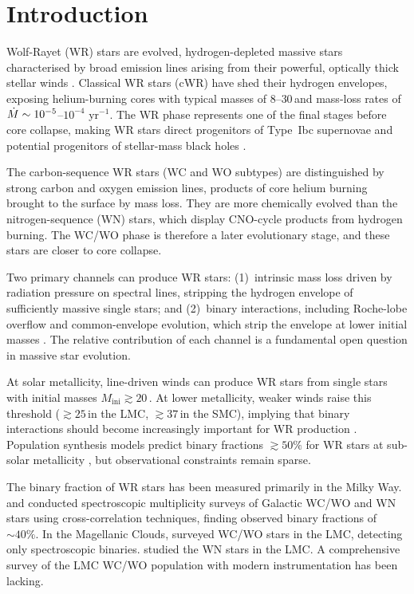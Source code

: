 \section{Introduction}
\label{sec:intro}

Wolf-Rayet (WR) stars are evolved, hydrogen-depleted massive stars
characterised by broad emission lines arising from their powerful,
optically thick stellar winds \citep{Crowther2007}. Classical WR stars
(cWR) have shed their hydrogen envelopes, exposing helium-burning cores
with typical masses of $8$--$30$\,\Msun and mass-loss rates of
$\dot{M} \sim 10^{-5}$--$10^{-4}$\,\Msun\,yr$^{-1}$. The WR phase
represents one of the final stages before core collapse, making WR stars
direct progenitors of Type~Ibc supernovae and potential progenitors of
stellar-mass black holes \citep{Sander2019}.

The carbon-sequence WR stars (WC and WO subtypes) are distinguished by
strong carbon and oxygen emission lines, products of core helium burning
brought to the surface by mass loss. They are more chemically evolved than
the nitrogen-sequence (WN) stars, which display CNO-cycle products from
hydrogen burning. The WC/WO phase is therefore a later evolutionary stage,
and these stars are closer to core collapse.

Two primary channels can produce WR stars: (1)~intrinsic mass loss driven
by radiation pressure on spectral lines, stripping the hydrogen envelope of
sufficiently massive single stars; and (2)~binary interactions, including
Roche-lobe overflow and common-envelope evolution, which strip the envelope
at lower initial masses \citep{Shenar2020}. The relative contribution of
each channel is a fundamental open question in massive star evolution.

At solar metallicity, line-driven winds can produce WR stars from single
stars with initial masses $M_\mathrm{ini} \gtrsim 20$\,\Msun. At lower
metallicity, weaker winds raise this threshold ($\gtrsim 25$\,\Msun in the
LMC, $\gtrsim 37$\,\Msun in the SMC), implying that binary interactions
should become increasingly important for WR production
\citep{Shenar2020}. Population synthesis models predict binary fractions
$\gtrsim 50\%$ for WR stars at sub-solar metallicity
\citep{Marchant2023}, but observational constraints remain sparse.

The binary fraction of WR stars has been measured primarily in the Milky
Way. \citet{Dsilva2020} and \citet{Dsilva2023} conducted spectroscopic
multiplicity surveys of Galactic WC/WO and WN stars using
cross-correlation techniques, finding observed binary fractions of
$\sim 40\%$. In the Magellanic Clouds, \citet{Bartzakos2001} surveyed
\Ntotal WC/WO stars in the LMC, detecting only \Nknown spectroscopic
binaries. \citet{Shenar2019} studied the WN stars in the LMC. A
comprehensive survey of the LMC WC/WO population with modern
instrumentation has been lacking.


